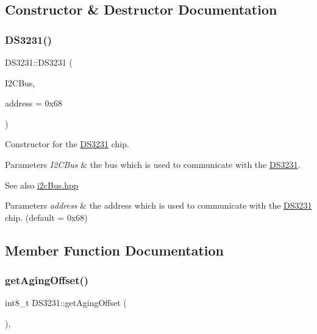 \subsection{Constructor \& Destructor Documentation}
\mbox{\label{class_d_s3231_ac1f8a5e8553eebfb90dbb432f00812a3}} 
\subsubsection{\texorpdfstring{D\+S3231()}{DS3231()}}
{\footnotesize\ttfamily D\+S3231\+::\+D\+S3231 (\begin{DoxyParamCaption}\item[{\mbox{\hyperlink{classi2c_bus}{i2c\+Bus}} \&}]{I2\+C\+Bus,  }\item[{uint8\+\_\+t}]{address = {\ttfamily 0x68} }\end{DoxyParamCaption})}



Constructor for the \mbox{\hyperlink{class_d_s3231}{D\+S3231}} chip. 


\begin{DoxyParams}{Parameters}
{\em I2\+C\+Bus} & the bus which is used to communicate with the \mbox{\hyperlink{class_d_s3231}{D\+S3231}}. \\
\hline
\end{DoxyParams}
\begin{DoxySeeAlso}{See also}
\mbox{\hyperlink{i2c_bus_8hpp_source}{i2c\+Bus.\+hpp}} 
\end{DoxySeeAlso}

\begin{DoxyParams}{Parameters}
{\em address} & the address which is used to communicate with the \mbox{\hyperlink{class_d_s3231}{D\+S3231}} chip. (default = 0x68) \\
\hline
\end{DoxyParams}


\subsection{Member Function Documentation}
\mbox{\label{class_d_s3231_a94e9f40f1b453dc4d8894b63bc0ec7d6}} 
\subsubsection{\texorpdfstring{get\+Aging\+Offset()}{getAgingOffset()}}
{\footnotesize\ttfamily int8\+\_\+t D\+S3231\+::get\+Aging\+Offset (\begin{DoxyParamCaption}{ }\end{DoxyParamCaption})\hspace{0.3cm}{\ttfamily [override]}, {\ttfamily [virtual]}}



